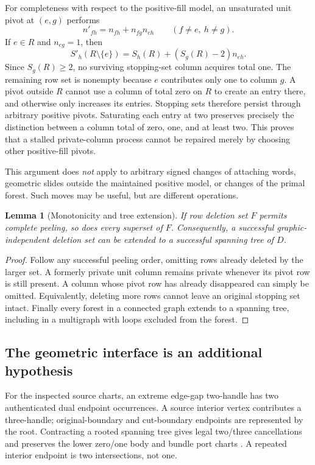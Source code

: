 \documentclass[11pt,letterpaper]{article}
\newtheorem{lemma}[theorem]{Lemma}
\theoremstyle{definition}
\begin{document}
For completeness with respect to the positive-fill model, an unsaturated
unit pivot at $(e,g)$ performs
\[
 n'_{fh}=n_{fh}+n_{fg}n_{eh}\qquad(f\ne e,\ h\ne g).
\]
If $e\in R$ and $n_{eg}=1$, then
\begin{equation}\label{eq:stopping-update}
 S'_h(R\setminus\{e\})
   =S_h(R)+(S_g(R)-2)n_{eh}.
\end{equation}
Since $S_g(R)\geq2$, no surviving stopping-set column acquires total one.
The remaining row set is nonempty because $e$ contributes only one to column
$g$. A pivot outside $R$ cannot use a column of total zero on $R$ to create
an entry there, and otherwise only increases its entries. Stopping sets
therefore persist through arbitrary positive pivots. Saturating each entry
at two preserves precisely the distinction between a column total of zero,
one, and at least two. This proves that a stalled private-column process
cannot be repaired merely by choosing other positive-fill pivots.

This argument does \emph{not} apply to arbitrary signed changes of attaching
words, geometric slides outside the maintained positive model, or changes
of the primal forest. Such moves may be useful, but are different operations.

\begin{lemma}[Monotonicity and tree extension]\label{lem:monotone}
If row deletion set $F$ permits complete peeling, so does every superset of
$F$. Consequently, a successful graphic-independent deletion set can be
extended to a successful spanning tree of $D$.
\end{lemma}
\begin{proof}
Follow any successful peeling order, omitting rows already deleted by the
larger set. A formerly private unit column remains private whenever its
pivot row is still present. A column whose pivot row has already disappeared
can simply be omitted. Equivalently, deleting more rows cannot leave an
original stopping set intact. Finally every forest in a connected graph
extends to a spanning tree, including in a multigraph with loops excluded
from the forest.
\end{proof}

\subsection{The geometric interface is an additional hypothesis}
For the inspected source charts, an extreme edge-gap two-handle has two
authenticated dual endpoint occurrences. A source interior vertex contributes
a three-handle; original-boundary and cut-boundary endpoints are represented
by the root. Contracting a rooted spanning tree gives legal two/three
cancellations and preserves the lower zero/one body and bundle port charts
\cite{dual}. A repeated interior endpoint is two intersections, not one.
\end{document}

